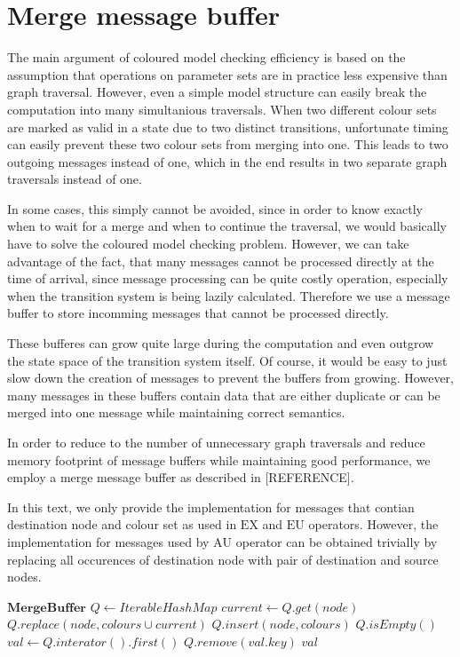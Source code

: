 \documentclass[12pt,oneside,draft]{fithesis2}
\newcommand{\eu}[2]{\ensuremath{\mbox{E} #1 \mbox{U} #2 }}
\newcommand{\au}[2]{\ensuremath{\mbox{A} #1 \mbox{U} #2 }}
\newcommand{\ex}[1]{\ensuremath{\mbox{EX} #1}}
\begin{document}
								
		\section{Merge message buffer}
			
			The main argument of coloured model checking efficiency is based on the assumption that operations on parameter sets are in practice less expensive than graph traversal. However, even a simple model structure can easily break the computation into many simultanious traversals. When two different colour sets are marked as valid in a state due to two distinct transitions, unfortunate timing can easily prevent these two colour sets from merging into one. This leads to two outgoing messages instead of one, which in the end results in two separate graph traversals instead of one. 
			
			In some cases, this simply cannot be avoided, since in order to know exactly when to wait for a merge and when to continue the traversal, we would basically have to solve the coloured model checking problem. However, we can take advantage of the fact, that many messages cannot be processed directly at the time of arrival, since message processing can be quite costly operation, especially when the transition system is being lazily calculated. Therefore we use a message buffer to store incomming messages that cannot be processed directly.
			
			These bufferes can grow quite large during the computation and even outgrow the state space of the transition system itself. Of course, it would be easy to just slow down the creation of messages to prevent the buffers from growing. However, many messages in these buffers contain data that are either duplicate or can be merged into one message while maintaining correct semantics.
			
			In order to reduce to the number of unnecessary graph traversals and reduce memory footprint of message buffers while maintaining good performance, we employ a merge message buffer as described in [REFERENCE]. 
			
			In this text, we only provide the implementation for messages that contian destination node and colour set as used in $\ex{}$ and $\eu{}{}$ operators. However, the implementation for messages used by $\au{}{}$ operator can be obtained trivially by replacing all occurences of destination node with pair of destination and source nodes.
			
			\begin{algorithmic}[1]
			\State $ \textbf{MergeBuffer} $
			\State $ Q \gets IterableHashMap $
					\State $current \gets Q.get(node)$
					\State $Q.replace(node, colours \cup current)$
				\Else
					\State $Q.insert(node, colours)$				
				\EndIf
			\EndProcedure
				\State \Return $Q.isEmpty()$
			\EndProcedure
				\State $val \gets Q.interator().first()$
				\State $Q.remove(val.key)$
				\State \Return $val$
			\EndProcedure
			\end{algorithmic}				
			
\end{document}
